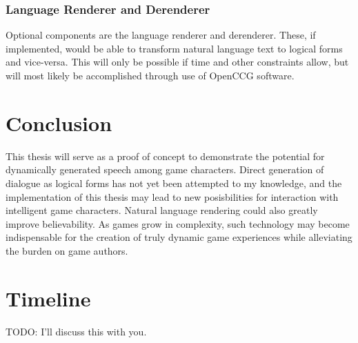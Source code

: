 \documentclass{article}
\begin{document}
\subsubsection{Language Renderer and Derenderer}

Optional components are the language renderer and derenderer.  These, if implemented,
would be able to transform natural language text to logical forms and vice-versa.
This will only be possible if time and other constraints allow, but will most likely
be accomplished through use of OpenCCG\cite{White2011} software.

\section{Conclusion}

This thesis will serve as a proof of concept to demonstrate the potential for dynamically
generated speech among game characters.  Direct generation of dialogue as logical forms
has not yet been attempted to my knowledge, and the implementation of this thesis may
lead to new posisbilities for interaction with intelligent game characters.  Natural language
rendering could also greatly improve believability.  As games grow in complexity, such
technology may become indispensable for the creation of truly dynamic game experiences
while alleviating the burden on game authors.

\section{Timeline}

TODO: I'll discuss this with you.


{}
\end{document}
